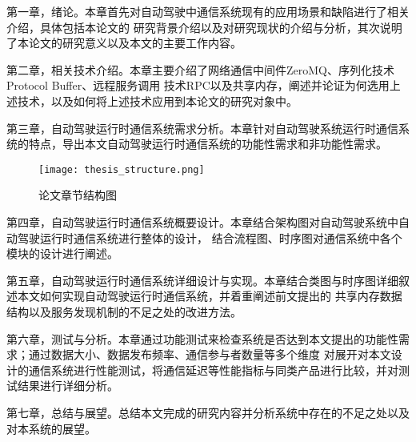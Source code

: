 第一章，绪论。本章首先对自动驾驶中通信系统现有的应用场景和缺陷进行了相关介绍，具体包括本论文的
研究背景介绍以及对研究现状的介绍与分析，其次说明了本论文的研究意义以及本文的主要工作内容。

第二章，相关技术介绍。本章主要介绍了网络通信中间件ZeroMQ、序列化技术Protocol Buffer、远程服务调用
技术RPC以及共享内存，阐述并论证为何选用上述技术，以及如何将上述技术应用到本论文的研究对象中。

第三章，自动驾驶运行时通信系统需求分析。本章针对自动驾驶系统运行时通信系统的特点，导出本文自动驾驶运行时通信系统的功能性需求和非功能性需求。

\begin{figure}[htb]
  \centering
  \texttt{[image: thesis\_structure.png]}
  \caption{论文章节结构图}
  \label{thesis_structure}
\end{figure}

第四章，自动驾驶运行时通信系统概要设计。本章结合架构图对自动驾驶系统中自动驾驶运行时通信系统进行整体的设计，
结合流程图、时序图对通信系统中各个模块的设计进行阐述。

第五章，自动驾驶运行时通信系统详细设计与实现。本章结合类图与时序图详细叙述本文如何实现自动驾驶运行时通信系统，并着重阐述前文提出的
共享内存数据结构以及服务发现机制的不足之处的改进方法。

第六章，测试与分析。本章通过功能测试来检查系统是否达到本文提出的功能性需求；通过数据大小、数据发布频率、通信参与者数量等多个维度
对展开对本文设计的通信系统进行性能测试，将通信延迟等性能指标与同类产品进行比较，并对测试结果进行详细分析。

第七章，总结与展望。总结本文完成的研究内容并分析系统中存在的不足之处以及对本系统的展望。







